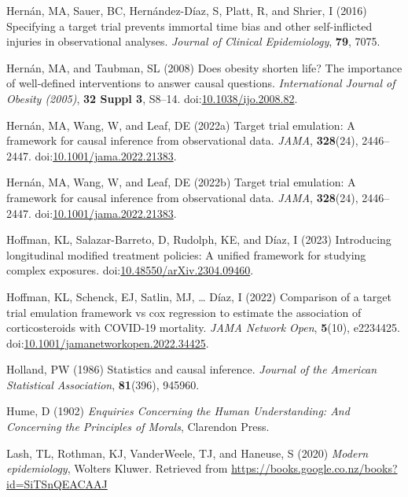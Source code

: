 \documentclass[
  singlecolumn,
  9pt]{article}
\begin{document}
\begin{CSLReferences}
Hernán, MA, Sauer, BC, Hernández-Díaz, S, Platt, R, and Shrier, I (2016)
Specifying a target trial prevents immortal time bias and other
self-inflicted injuries in observational analyses. \emph{Journal of
Clinical Epidemiology}, \textbf{79}, 7075.

Hernán, MA, and Taubman, SL (2008) Does obesity shorten life? The
importance of well-defined interventions to answer causal questions.
\emph{International Journal of Obesity (2005)}, \textbf{32 Suppl 3},
S8--14.
doi:\href{https://doi.org/10.1038/ijo.2008.82}{10.1038/ijo.2008.82}.

Hernán, MA, Wang, W, and Leaf, DE (2022a) Target trial emulation: A
framework for causal inference from observational data. \emph{JAMA},
\textbf{328}(24), 2446--2447.
doi:\href{https://doi.org/10.1001/jama.2022.21383}{10.1001/jama.2022.21383}.

Hernán, MA, Wang, W, and Leaf, DE (2022b) Target trial emulation: A
framework for causal inference from observational data. \emph{JAMA},
\textbf{328}(24), 2446--2447.
doi:\href{https://doi.org/10.1001/jama.2022.21383}{10.1001/jama.2022.21383}.

Hoffman, KL, Salazar-Barreto, D, Rudolph, KE, and Díaz, I (2023)
Introducing longitudinal modified treatment policies: A unified
framework for studying complex exposures.
doi:\href{https://doi.org/10.48550/arXiv.2304.09460}{10.48550/arXiv.2304.09460}.

Hoffman, KL, Schenck, EJ, Satlin, MJ, \ldots{} Díaz, I (2022) Comparison
of a target trial emulation framework vs cox regression to estimate the
association of corticosteroids with COVID-19 mortality. \emph{JAMA
Network Open}, \textbf{5}(10), e2234425.
doi:\href{https://doi.org/10.1001/jamanetworkopen.2022.34425}{10.1001/jamanetworkopen.2022.34425}.

Holland, PW (1986) Statistics and causal inference. \emph{Journal of the
American Statistical Association}, \textbf{81}(396), 945960.

Hume, D (1902) \emph{Enquiries Concerning the Human Understanding: And
Concerning the Principles of Morals}, Clarendon Press.

Lash, TL, Rothman, KJ, VanderWeele, TJ, and Haneuse, S (2020)
\emph{Modern epidemiology}, Wolters Kluwer. Retrieved from
\url{https://books.google.co.nz/books?id=SiTSnQEACAAJ}


\end{CSLReferences}
\end{document}
